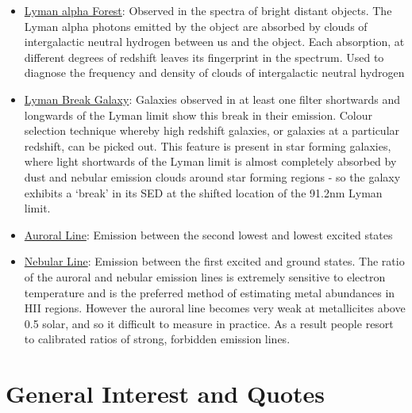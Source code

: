 \documentclass{literature}
\begin{document}
\begin{itemize}
\item \underline{Lyman alpha Forest}: Observed in the spectra of bright distant objects. The Lyman alpha photons emitted by the object are absorbed by clouds of intergalactic neutral hydrogen between us and the object. Each absorption, at different degrees of redshift leaves its fingerprint in the spectrum. Used to diagnose the frequency and density of clouds of intergalactic neutral hydrogen
\item \underline{Lyman Break Galaxy}: Galaxies observed in at least one filter shortwards and longwards of the Lyman limit show this break in their emission. Colour selection technique whereby high redshift galaxies, or galaxies at a particular redshift, can be picked out. This feature is present in star forming galaxies, where light shortwards of the Lyman limit is almost completely absorbed by dust and nebular emission clouds around star forming regions - so the galaxy exhibits a `break' in its SED at the shifted location of the 91.2nm Lyman limit.
\item \underline{Auroral Line}: Emission between the second lowest and lowest excited states 
\item \underline{Nebular Line}: Emission between the first excited and ground states. The ratio of the auroral and nebular emission lines is extremely sensitive to electron temperature and is the preferred method of estimating metal abundances in HII regions. However the auroral line becomes very weak at metallicites above 0.5 solar, and so it difficult to measure in practice. As a result people resort to calibrated ratios of strong, forbidden emission lines.  
\end{itemize}





\section{General Interest and Quotes}
\end{document}
